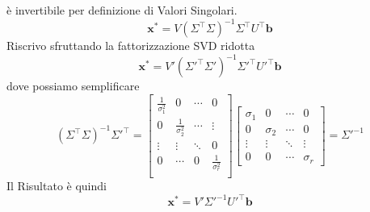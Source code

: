 \documentclass[11pt]{article}
\begin{document}
è invertibile per definizione di Valori Singolari.\\
\[
\mathbf{x}^* = V (\Sigma^\top \Sigma)^{-1} \Sigma^\top U^\top \mathbf{b}
\]
Riscrivo sfruttando la fattorizzazione SVD ridotta
\[
\mathbf{x}^* = V' (\Sigma'^\top \Sigma')^{-1} \Sigma'^\top U'^\top \mathbf{b}
\]
dove possiamo semplificare
\[
(\Sigma^\top \Sigma)^{-1} \Sigma'^\top=
\begin{bmatrix}
\frac{1}{\sigma_1^2} & 0 & \cdots & 0 \\
0 & \frac{1}{\sigma_2^2} & \cdots & \vdots \\
\vdots & \vdots & \ddots & 0  \\
0 & \cdots & 0 & \frac{1}{\sigma_r^2}  \\
\end{bmatrix}\begin{bmatrix}
    \sigma_1 & 0 & \cdots & 0 \\
    0 & \sigma_2 & \cdots & 0 \\
    \vdots & \vdots & \ddots & \vdots \\
    0 & 0 & \cdots & \sigma_r
\end{bmatrix}=\Sigma'^{-1}
\]
Il Risultato è quindi
\[
\mathbf{x}^* = V' \Sigma'^{-1} U'^\top \mathbf{b}
\]
\end{document}
